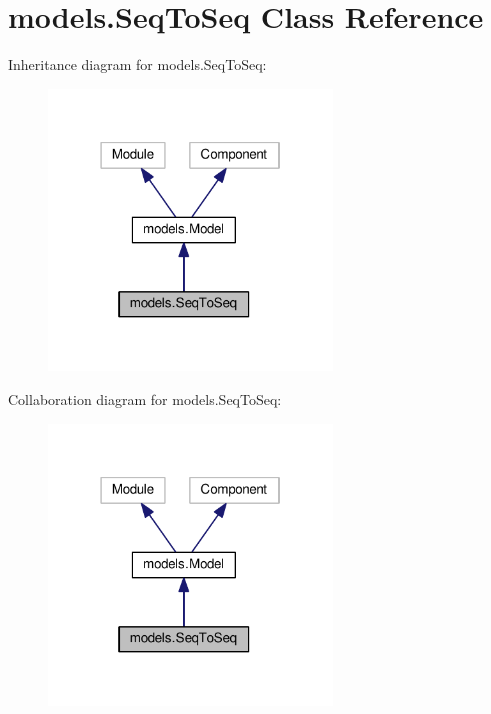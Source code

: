 \hypertarget{classmodels_1_1SeqToSeq}{}\section{models.\+Seq\+To\+Seq Class Reference}
\label{classmodels_1_1SeqToSeq}


Inheritance diagram for models.\+Seq\+To\+Seq\+:
\nopagebreak
\begin{figure}[H]
\begin{center}
\leavevmode
\includegraphics[width=214pt]{classmodels_1_1SeqToSeq__inherit__graph}
\end{center}
\end{figure}


Collaboration diagram for models.\+Seq\+To\+Seq\+:
\nopagebreak
\begin{figure}[H]
\begin{center}
\leavevmode
\includegraphics[width=214pt]{classmodels_1_1SeqToSeq__coll__graph}
\end{center}
\end{figure}
